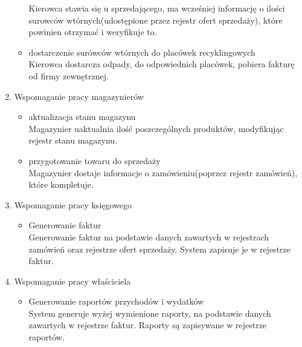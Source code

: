 \begin{enumerate}
\begin{itemize}
		Kierowca stawia się u sprzedającego, ma wcześniej informację o ilości surowców wtórnych(udostępione przez rejestr ofert sprzedaży), które powinien otrzymać i weryfikuje to.
		\item dostarczenie surówców wtórnych do placówek recyklingowych \\ 
		Kierowca dostarcza odpady, do odpowiednich placówek, pobiera fakturę od firmy zewnętrznej.
		\end{itemize}
	\item Wspomaganie pracy magazynierów
		\begin{itemize}
		\item aktualizacja stanu magazynu \\
	 	Magazynier uaktualnia ilość poszczególnych produktów, modyfikując rejestr stanu magazynu.
	 	\item przygotowanie towaru do sprzedaży \\
	 	Magazynier dostaje informacje o zamówieniu(poprzez rejestr zamówień), które kompletuje.
		\end{itemize}
	\item Wspomaganie pracy księgowego
		\begin{itemize}
		\item Generowanie faktur \\ 
		Generowanie faktur na podstawie danych zawartych w rejestrach zamówień oraz rejestrze ofert sprzedaży. System zapisuje je w rejestrze faktur.
		\end{itemize}
	\item Wspomaganie pracy właściciela
		\begin{itemize}
		\item Generowanie raportów przychodów i wydatków\\
		System generuje wyżej wymienione raporty, na podstawie danych zawartych w rejestrze faktur. Raporty są zapisywane w rejestrze raportów.
		\end{itemize}

\end{enumerate}